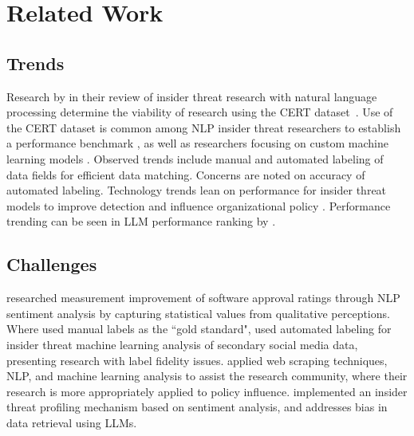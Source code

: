 \section{Related Work}
\subsection{Trends}

Research by \cite{alzaabi_review_2024} in their review of insider threat research with natural language processing determine the viability of research using the CERT dataset~\cite{cmu_insider_2020}. Use of the CERT dataset is common among NLP insider threat researchers to establish a performance benchmark \cite{anul_haq_insider_2022,kumar_thee_2023,mittal_prediction_2023}, as well as researchers focusing on custom machine learning models \cite{he_insider_2021,apau_theoretical_2019}. Observed trends include manual \cite{weitl-harms_using_2024,soh_employee_2019} and automated labeling \cite{mittal_design_2023,moallem_understanding_2020,park_detecting_2018} of data fields for efficient data matching. Concerns are noted on accuracy of automated labeling. Technology trends lean on performance for insider threat models to improve detection \cite{yadav_sentiment_2022} and influence organizational policy \cite{osterritter_conversations_2021,randle_critical_2017,reegard_concept_2019}. Performance trending can be seen in LLM performance ranking by \cite{vardhni_performance_2024,metcalfe_enhancing_2024}.

\subsection{Challenges}

  \cite{weitl-harms_using_2024} researched measurement improvement of software approval ratings through NLP sentiment analysis by capturing statistical values from qualitative perceptions. Where \cite{weitl-harms_using_2024} used manual labels as the ``gold standard", \cite{park_detecting_2018} used automated labeling for insider threat machine learning analysis of secondary social media data, presenting research with label fidelity issues. \cite{camargo-henriquez_web_2022,mahto_dive_2016,yadav_sentiment_2022,nalawati_sentiment_2022,singh_enumerable_2022} applied web scraping techniques, NLP, and machine learning analysis to assist the research community, where their research is more appropriately applied to policy influence. \cite{soh_employee_2019} implemented an insider threat profiling mechanism based on sentiment analysis, and \cite{dai_bias_2024} addresses bias in data retrieval using LLMs.
    
